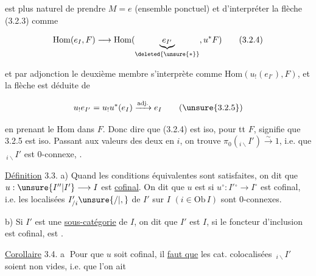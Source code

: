 
est plus naturel de prendre $M=e$ (ensemble ponctuel) et d'interpréter la flèche (3.2.3) comme

\[
\mathrm{Hom}(e_I,F)\longrightarrow\mathrm{Hom}(\underbrace{e_{I'}}_{\deleted{\unsure{*}}},u^*F)\tag*{(3.2.4)}
\]

et par adjonction  le deuxième membre s'interprète comme $\mathrm{Hom}(u_!(e_{I'}),F)$, et la flèche est déduite de

\[
u_!e_{I'}=u_!u^*(e_I)\xrightarrow{\mathrm{adj.}}e_I \tag*{(\unsure{3.2.5})}
\]

en prenant le $\mathrm{Hom}$ dans $F$. Donc dire que (3.2.4) est iso, pour tt $F$, signifie que 3.2.5 est iso.  Passant aux valeurs des deux  en $i$, on trouve $\pi_0({}_{i\backslash}I')\overset{\sim}{\longrightarrow}1$, i.e. que $\,{}_{i\backslash}I'$ est $0$-connexe, .


\uline{Définition} 3.3. a)  Quand les conditions équivalentes  sont satisfaites,  on dit que $u:\unsure{I''|I'}\longrightarrow I$ est \uline{cofinal}. On dit que $u$ est  si $u^\circ:I'{}^\circ\longrightarrow I^\circ$ est cofinal, i.e. les localisées $I'_{/i}\unsure{/|,}$ de $I'$ sur $I$ $(i\in\mathrm{Ob}\,I)$ sont $0$-connexes.

b) Si $I'$ est une \uline{sous-catégorie} de $I$, on dit que $I'$ est  $I$, si le foncteur d'inclusion est cofinal,   est .

\uline{Corollaire} 3.4. \textcircled{a} Pour que $u$ soit cofinal,  il \uline{faut que} les cat. colocalisées $\,{}_{i\backslash}I'$ soient non vides, i.e. que l'on ait
